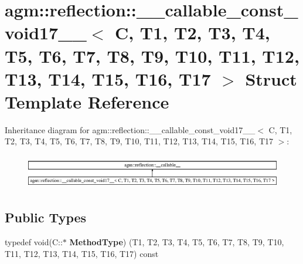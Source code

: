 \hypertarget{structagm_1_1reflection_1_1____callable__const__void17____}{}\section{agm\+:\+:reflection\+:\+:\+\_\+\+\_\+callable\+\_\+const\+\_\+void17\+\_\+\+\_\+$<$ C, T1, T2, T3, T4, T5, T6, T7, T8, T9, T10, T11, T12, T13, T14, T15, T16, T17 $>$ Struct Template Reference}
\label{structagm_1_1reflection_1_1____callable__const__void17____}
Inheritance diagram for agm\+:\+:reflection\+:\+:\+\_\+\+\_\+callable\+\_\+const\+\_\+void17\+\_\+\+\_\+$<$ C, T1, T2, T3, T4, T5, T6, T7, T8, T9, T10, T11, T12, T13, T14, T15, T16, T17 $>$\+:\begin{figure}[H]
\begin{center}
\leavevmode
\includegraphics[height=1.509434cm]{structagm_1_1reflection_1_1____callable__const__void17____}
\end{center}
\end{figure}
\subsection*{Public Types}
\begin{DoxyCompactItemize}
\item 
typedef void(C\+::$\ast$ {\bfseries Method\+Type}) (T1, T2, T3, T4, T5, T6, T7, T8, T9, T10, T11, T12, T13, T14, T15, T16, T17) const \hypertarget{structagm_1_1reflection_1_1____callable__const__void17_____a2608bcc5cb5b46a199bdf4242a1821c9}{}\label{structagm_1_1reflection_1_1____callable__const__void17_____a2608bcc5cb5b46a199bdf4242a1821c9}

\end{DoxyCompactItemize}
